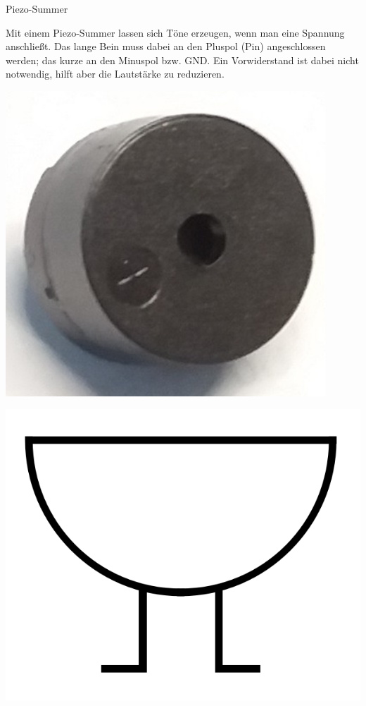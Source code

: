 \medskip
\begin{zsfg}{Piezo-Summer}
	
	\begin{minipage}{0.7\textwidth}
		Mit einem Piezo-Summer lassen sich Töne erzeugen, wenn man eine Spannung anschließt. Das lange Bein muss dabei an den Pluspol (Pin) angeschlossen werden; das kurze an den Minuspol bzw. GND. Ein Vorwiderstand ist dabei nicht notwendig, hilft aber die Lautstärke zu reduzieren.
	\end{minipage}
	\hfill
	\begin{minipage}{0.28\textwidth}
		\begin{minipage}{0.48\textwidth}
			\centering
			\includegraphics[width=0.9\textwidth]{./pics/piezo-summer.jpg}
		\end{minipage}
		\hfill
		\begin{minipage}{0.48\textwidth}
			\centering
			\includegraphics[width=\textwidth]{./pics/piezo-schaltsymbol.png}
		\end{minipage}
	\end{minipage}
	

\end{zsfg}
